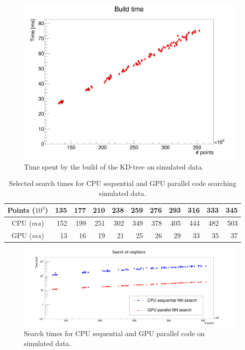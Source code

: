 \begin{figure}
\includegraphics[width=\textwidth]{rechits/BuildTimes.png}
\caption{Time spent by the build of the KD-tree on simulated data.}
\label{fkdtree_build_sim_times}
\end{figure}

\begin{center}
\begin{table}[h]
\begin{tabular}{ c || r r r r r r r r r r}
Points ($10^{3}$) & 135 & 177 & 210 & 238 & 259 & 276 & 293 & 316 & 333 & 345 \\
\hline
CPU ($\unit{ms}$) & 152 & 199 & 251 & 302 & 349 & 378 & 405 & 444 & 482 & 503 \\
GPU ($\unit{ms}$) & 13 & 16 & 19 & 21 & 25 & 26 & 29 & 33 & 35 & 37 \\
\end{tabular}
\caption{Selected search times for CPU sequential and GPU parallel code searching simulated data.}
\label{fkdtree_times_sim_tab}
\end{table}
\end{center}

\begin{figure}
\includegraphics[width=\textwidth]{rechits/SearchTimes.png}
\caption{Search times for CPU sequential and GPU parallel code on simulated data.}
\label{fkdtree_search_times}
\end{figure}

